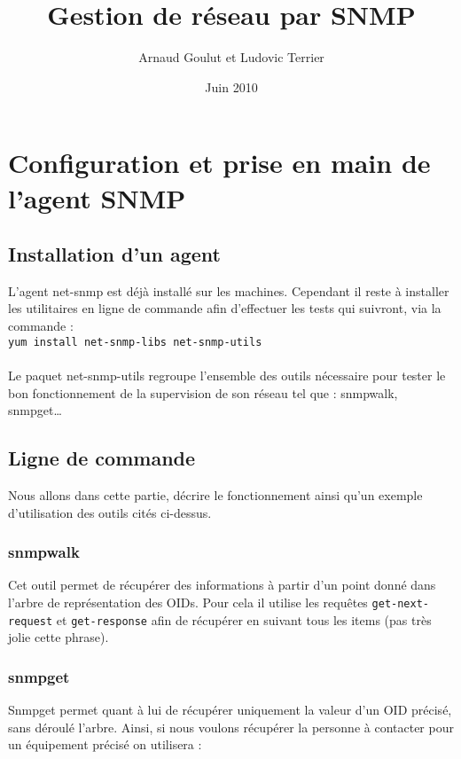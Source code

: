 \documentclass[12pt,a4paper,notitlepage]{article}
\begin{document}
\title{Gestion de réseau par SNMP}
\author{Arnaud Goulut et Ludovic Terrier}
\date{Juin 2010}
\maketitle



\thispagestyle{empty}


 
\section{Configuration et prise en main de l'agent SNMP}
\subsection{Installation d'un agent}
L'agent net-snmp est déjà installé sur les machines. Cependant il reste à installer les utilitaires en ligne de commande afin d'effectuer les tests qui suivront, via la commande :\\


\noindent \texttt{yum install net-snmp-libs net-snmp-utils}

\paragraph{}Le paquet net-snmp-utils regroupe l'ensemble des outils nécessaire pour tester le bon fonctionnement de la supervision de son réseau tel que : snmpwalk, snmpget\ldots 

\subsection{Ligne de commande}
Nous allons dans cette partie, décrire le fonctionnement ainsi qu'un exemple d'utilisation des outils cités ci-dessus.

\subsubsection{snmpwalk}
Cet outil permet de récupérer des informations à partir d'un point donné dans l'arbre de représentation des OIDs. Pour cela il utilise les requêtes \texttt{get-next-request} et \texttt{get-response} afin de récupérer en suivant tous les items (pas très jolie cette phrase).

\subsubsection{snmpget}
Snmpget permet quant à lui de récupérer uniquement la valeur d'un OID précisé, sans déroulé l'arbre. Ainsi, si nous voulons récupérer la personne à contacter pour un équipement précisé on utilisera :\\
\end{document}
